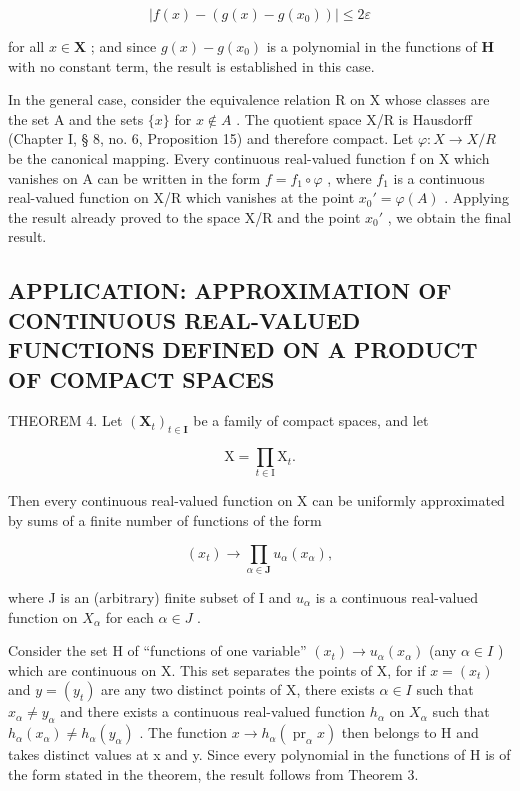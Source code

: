 \[
\left| f (x) - \left(g (x) - g \left(x _ {0}\right)\right) \right| \leqslant 2 \varepsilon
\]

for all \(x \in \mathbf{X}\) ; and since \(g(x) - g(x_0)\) is a polynomial in the functions of \(\mathbf{H}\) with no constant term, the result is established in this case.

In the general case, consider the equivalence relation R on X whose classes are the set A and the sets \(\{x\}\) for \(x \notin A\) . The quotient space X/R is Hausdorff (Chapter I, § 8, no. 6, Proposition 15) and therefore compact. Let \(\varphi: X \to X/R\) be the canonical mapping. Every continuous real-valued function f on X which vanishes on A can be written in the form \(f = f_{1} \circ \varphi\) , where \(f_{1}\) is a continuous real-valued function on X/R which vanishes at the point \(x_{0}' = \varphi(A)\) . Applying the result already proved to the space X/R and the point \(x_{0}'\) , we obtain the final result.

\subsection{APPLICATION: APPROXIMATION OF CONTINUOUS REAL-VALUED FUNCTIONS DEFINED ON A PRODUCT OF COMPACT SPACES}

THEOREM 4. Let \((\mathbf{X}_t)_{t\in \mathbf{I}}\) be a family of compact spaces, and let

\[
\mathrm{X} = \prod_ {t \in \mathrm{I}} \mathrm{X} _ {t}.
\]

Then every continuous real-valued function on X can be uniformly approximated by sums of a finite number of functions of the form

\[
(x _ {t}) \rightarrow \prod_ {\alpha \in \mathbf {J}} u _ {\alpha} (x _ {\alpha}),
\]

where J is an (arbitrary) finite subset of I and \(u_{\alpha}\) is a continuous real-valued function on \(X_{\alpha}\) for each \(\alpha \in J\) .

Consider the set H of ``functions of one variable'' \((x_{t}) \rightarrow u_{\alpha}(x_{\alpha})\) (any \(\alpha \in I\) ) which are continuous on X. This set separates the points of X, for if \(x = (x_{t})\) and \(y = (y_{t})\) are any two distinct points of X, there exists \(\alpha \in I\) such that \(x_{\alpha} \neq y_{\alpha}\) and there exists a continuous real-valued function \(h_{\alpha}\) on \(X_{\alpha}\) such that \(h_{\alpha}(x_{\alpha}) \neq h_{\alpha}(y_{\alpha})\) . The function \(x \rightarrow h_{\alpha}(\operatorname{pr}_{\alpha} x)\) then belongs to H and takes distinct values at x and y. Since every polynomial in the functions of H is of the form stated in the theorem, the result follows from Theorem 3.


